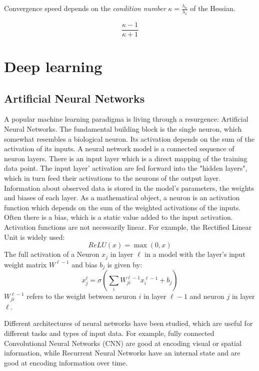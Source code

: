 \documentclass[twoside,12pt,a4paper]{report}
\begin{document}
Convergence speed depends on the \textit{condition number} $\kappa = \frac{\lambda_n}{\lambda_1}$ of the Hessian.

$$ \frac{\kappa - 1}{\kappa + 1}$$


\section{Deep learning}
\subsection{Artificial Neural Networks}
A popular machine learning paradigma is living through a resurgence: Artificial Neural Networks. The fundamental building block is the single neuron, which somewhat resembles a biological neuron. Its activation depends on the sum of the activation of its inputs. A neural network model is a connected sequence of neuron layers. There is an input layer which is a direct mapping of the training data point. The input layer' activation are fed forward into the "hidden layers", which in turn feed their activations to the neurons of the output layer. Information about observed data is stored in the model's parameters, the weights and biases of each layer.
As a mathematical object, a neuron is an activation function which depends on the sum of the weighted activations of the inputs. Often there is a bias, which is a static value added to the input activation. Activation functions are not necessarily linear.
For example, the Rectified Linear Unit is widely used:
$$ReLU(x) = \max(0,x) $$
The full activation of a Neuron $x_j$ in layer $\ell$ in a model with the layer's input weight matrix $W^{\ell -1}$ and bias $b_j$ is given by:
$$x_j^{\ell}=\sigma \left( \sum\limits_i W^{\ell -1}_{ji}x_i^{\ell-1} + b_j\right)$$
$W^{\ell -1}_{ji}$ refers to the weight between neuron $i$ in layer $\ell -1$ and neuron $j$ in layer $\ell$.

Different architectures of neural networks have been studied, which are useful for different tasks and types of input data. For example, fully connected Convolutional Neural Networks (CNN) are good at encoding visual or spatial information, while Recurrent Neural Networks have an internal state and are good at encoding information over time.
\end{document}
